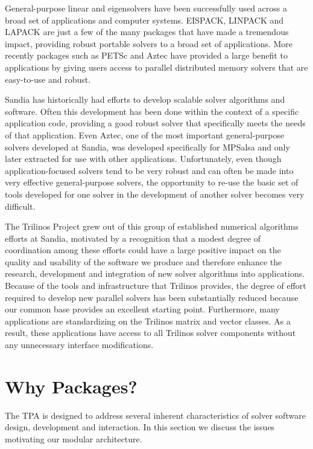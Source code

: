 \documentclass[12pt,relax]{TPA}
\begin{document}
General-purpose linear and eigensolvers have been successfully 
used across a broad set of applications and computer systems. 
EISPACK, LINPACK and LAPACK are just a few of the many packages 
that have made a tremendous impact, providing robust portable 
solvers to a broad set of applications. More recently packages 
such as PETSc and Aztec have provided a large benefit to 
applications by giving users access to parallel distributed 
memory solvers that are easy-to-use and robust. 

Sandia has historically had efforts to develop scalable solver 
algorithms and software. Often this development has been done 
within the context of a specific application code, providing a 
good robust solver that specifically meets the needs of that 
application. Even Aztec, one of the most important general-purpose 
solvers developed at Sandia, was developed specifically for 
MPSalsa and only later extracted for use with other applications. 
Unfortunately, even though application-focused solvers tend to 
be very robust and can often be made into very effective 
general-purpose solvers, the opportunity to re-use the basic 
set of tools developed for one solver in the development of 
another solver becomes very difficult. 

The Trilinos Project grew out of this group of established 
numerical algorithms efforts at Sandia, motivated by a recognition 
that a modest degree of coordination among these efforts could 
have a large positive impact on the quality and usability of 
the software we produce and therefore enhance the research, 
development and integration of new solver algorithms into 
applications. Because of the tools and infrastructure that 
Trilinos provides, the degree of effort required to develop 
new parallel solvers has been substantially reduced because 
our common base provides an excellent starting point. Furthermore, 
many applications are standardizing on the Trilinos matrix and 
vector classes. As a result, these applications have access to 
all Trilinos solver components without any unnecessary interface 
modifications. 

\section{Why Packages?}

The TPA is designed to address several inherent characteristics of
solver software design, development and interaction.  In this section we
discuss the issues motivating our modular architecture.
\end{document}
